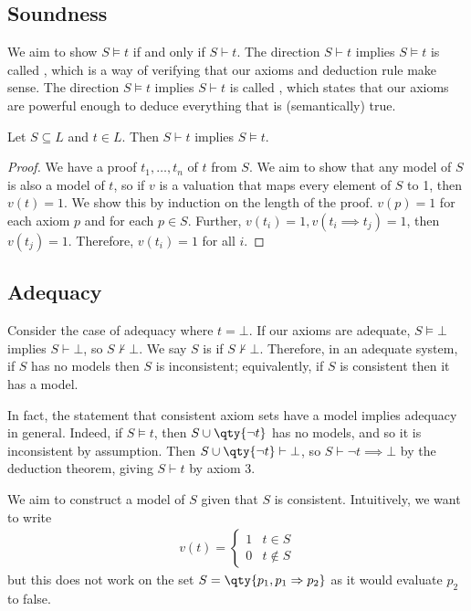 \subsection{Soundness}
We aim to show $S \models t$ if and only if $S \vdash t$.
The direction $S \vdash t$ implies $S \models t$ is called , which is a way of verifying that our axioms and deduction rule make sense.
The direction $S \models t$ implies $S \vdash t$ is called , which states that our axioms are powerful enough to deduce everything that is (semantically) true.
\begin{proposition}
    Let $S \subseteq L$ and $t \in L$.
    Then $S \vdash t$ implies $S \models t$.
\end{proposition}
\begin{proof}
    We have a proof $t_1, \dots, t_n$ of $t$ from $S$.
    We aim to show that any model of $S$ is also a model of $t$, so if $v$ is a valuation that maps every element of $S$ to 1, then $v(t) = 1$.
    We show this by induction on the length of the proof.
    $v(p) = 1$ for each axiom $p$ and for each $p \in S$.
    Further, $v(t_i) = 1, v(t_i \implies t_j) = 1$, then $v(t_j) = 1$.
    Therefore, $v(t_i) = 1$ for all $i$.
\end{proof}

\subsection{Adequacy}
Consider the case of adequacy where $t = \bot$.
If our axioms are adequate, $S \models \bot$ implies $S \vdash \bot$, so $S \not\vdash \bot$.
We say $S$ is  if $S \not\vdash \bot$.
Therefore, in an adequate system, if $S$ has no models then $S$ is inconsistent; equivalently, if $S$ is consistent then it has a model.

In fact, the statement that consistent axiom sets have a model implies adequacy in general.
Indeed, if $S \models t$, then $S \cup \qty{\neg t}$ has no models, and so it is inconsistent by assumption.
Then $S \cup \qty{\neg t} \vdash \bot$, so $S \vdash \neg t \implies \bot$ by the deduction theorem, giving $S \vdash t$ by axiom 3.

We aim to construct a model of $S$ given that $S$ is consistent.
Intuitively, we want to write
\begin{align*}
v(t) = \begin{cases}
    1 & t \in S \\
    0 & t \not\in S
\end{cases}
\end{align*}
but this does not work on the set $S = \qty{p_1, p_1 \implies p_2}$ as it would evaluate $p_2$ to false.


